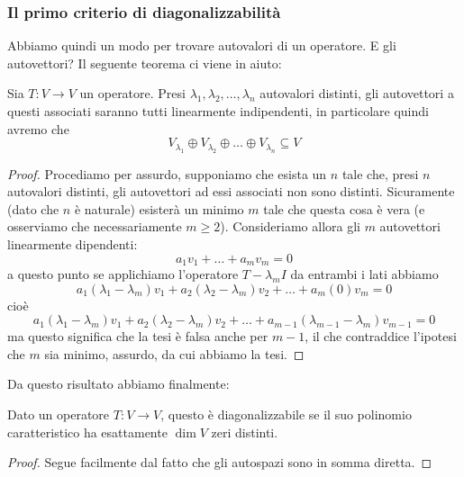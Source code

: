 \documentclass[11pt]{scrartcl}
\begin{document}
   	 \subsubsection{Il primo criterio di diagonalizzabilità}
   	 Abbiamo quindi un modo per trovare autovalori di un operatore. E gli autovettori? Il seguente teorema ci viene in aiuto:
   	 \begin{theorem}
   	 	Sia $T:V\to V$ un operatore. Presi $\lambda_1,\lambda_2,\dots,\lambda_n$ autovalori distinti, gli autovettori a questi associati saranno tutti linearmente indipendenti, in particolare quindi avremo che 
   	 	$$V_{\lambda_1}\oplus V_{\lambda_2}\oplus \dots \oplus V_{\lambda_n}\subseteq V$$
   	 \end{theorem}
   	 \begin{proof}
   	 	Procediamo per assurdo, supponiamo che esista un $n$ tale che, presi $n$ autovalori distinti, gli autovettori ad essi associati non sono distinti. Sicuramente (dato che $n$ è naturale) esisterà un minimo $m$ tale che questa cosa è vera (e osserviamo che necessariamente $m\ge 2$). Consideriamo allora gli $m$ autovettori linearmente dipendenti:
   	 	$$a_1v_1+\dots+a_mv_m=0$$
   	 	a questo punto se applichiamo l'operatore $T-\lambda_mI$ da entrambi i lati abbiamo 
   	 	$$a_1(\lambda_1-\lambda_m)v_1+a_2(\lambda_2-\lambda_m)v_2+\dots + a_m(0)v_m=0$$
   	 	cioè
   	 	$$a_1(\lambda_1-\lambda_m)v_1+a_2(\lambda_2-\lambda_m)v_2+\dots + a_{m-1}(\lambda_{m-1}-\lambda_m)v_{m-1}=0$$
   	 	ma questo significa che la tesi è falsa anche per $m-1$, il che contraddice l'ipotesi che $m$ sia minimo, assurdo, da cui abbiamo la tesi. 
   	 \end{proof}
   	 Da questo risultato abbiamo finalmente:
   	 \begin{corollary}
   	 	Dato un operatore $T:V\to V$, questo è diagonalizzabile se il suo polinomio caratteristico ha esattamente $\dim V$ zeri distinti.
   	 \end{corollary}
   	 \begin{proof}
   	 	Segue facilmente dal fatto che gli autospazi sono in somma diretta.
   	 \end{proof}
\end{document}
